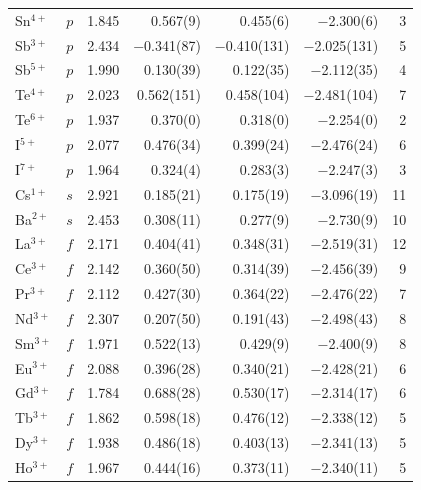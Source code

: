 \begin{longtable}{l l r r r r r}
  Sn$^{4+}$            & $p$   & 1.845 &       0.567(9) &       0.455(6) &    $-$2.300(6) & 3 \\
  Sb$^{3+}$            & $p$   & 2.434 &   $-$0.341(87) &  $-$0.410(131) &  $-$2.025(131) & 5 \\
  Sb$^{5+}$            & $p$   & 1.990 &      0.130(39) &      0.122(35) &   $-$2.112(35) & 4 \\
  Te$^{4+}$            & $p$   & 2.023 &     0.562(151) &     0.458(104) &  $-$2.481(104) & 7 \\
  Te$^{6+}$            & $p$   & 1.937 &       0.370(0) &       0.318(0) &    $-$2.254(0) & 2 \\
  I$^{5+}$             & $p$   & 2.077 &      0.476(34) &      0.399(24) &   $-$2.476(24) & 6 \\
  I$^{7+}$             & $p$   & 1.964 &       0.324(4) &       0.283(3) &    $-$2.247(3) & 3 \\
  Cs$^{1+}$            & $s$   & 2.921 &      0.185(21) &      0.175(19) &   $-$3.096(19) & 11 \\
  Ba$^{2+}$            & $s$   & 2.453 &      0.308(11) &       0.277(9) &    $-$2.730(9) & 10 \\
  La$^{3+}$            & $f$   & 2.171 &      0.404(41) &      0.348(31) &   $-$2.519(31) & 12 \\
  Ce$^{3+}$            & $f$   & 2.142 &      0.360(50) &      0.314(39) &   $-$2.456(39) & 9 \\
  Pr$^{3+}$            & $f$   & 2.112 &      0.427(30) &      0.364(22) &   $-$2.476(22) & 7 \\
  Nd$^{3+}$            & $f$   & 2.307 &      0.207(50) &      0.191(43) &   $-$2.498(43) & 8 \\
  Sm$^{3+}$            & $f$   & 1.971 &      0.522(13) &       0.429(9) &    $-$2.400(9) & 8 \\
  Eu$^{3+}$            & $f$   & 2.088 &      0.396(28) &      0.340(21) &   $-$2.428(21) & 6 \\
  Gd$^{3+}$            & $f$   & 1.784 &      0.688(28) &      0.530(17) &   $-$2.314(17) & 6 \\
  Tb$^{3+}$            & $f$   & 1.862 &      0.598(18) &      0.476(12) &   $-$2.338(12) & 5 \\
  Dy$^{3+}$            & $f$   & 1.938 &      0.486(18) &      0.403(13) &   $-$2.341(13) & 5 \\
  Ho$^{3+}$            & $f$   & 1.967 &      0.444(16) &      0.373(11) &   $-$2.340(11) & 5 \\

\end{longtable}
